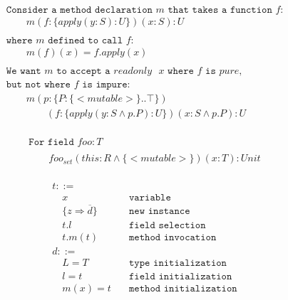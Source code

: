 \begin{equation*}
\begin{array}{l}
\texttt{Consider a method declaration $m$ that takes a function $f$:} \\
\qquad m(f: \{ apply(y: S): U \})(x: S): U \\
\\
\texttt{where $m$ defined to call $f$:}\\
\qquad m(f)(x) = f.apply(x) \\
\\
\texttt{We want $m$ to accept a $readonly$ $x$ where $f$ is $pure$,} \\
\texttt{but not where $f$ is impure:} \\
\qquad m(p: \{ P: \{<mutable>\} .. \top \}) \\
\qquad\qquad (f: \{ apply(y: S \land p.P): U \})(x: S \land p.P): U \\

\end{array}
\end{equation*}


\begin{equation*}
\begin{array}{l}
\texttt{For field } foo: T \\
\\
\qquad foo_{set}(this: R \land \{ <mutable> \})(x: T): Unit \\
\end{array}
\end{equation*}


\begin{equation*}
\begin{array}{ll}
t::=  & \\
\quad x & \quad \texttt{variable} \\
\quad \{ z \Rightarrow \overline{d} \} & \quad \texttt{new instance} \\
\quad t.l & \quad \texttt{field selection} \\
\quad t.m(t) & \quad \texttt{method invocation} \\
d::= & \\
\quad L=T & \quad \texttt{type initialization} \\
\quad l=t & \quad \texttt{field initialization} \\
\quad m(x)=t & \quad \texttt{method initialization} \\
\end{array}
\end{equation*}



